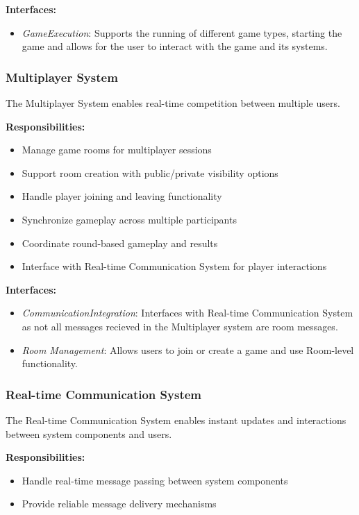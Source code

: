 \textbf{Interfaces:}
\begin{itemize}
    \item \textit{GameExecution}: Supports the running of different game types, starting the game and allows for the user to interact with the game and its systems.

\end{itemize}


\subsubsection{Multiplayer System}
The Multiplayer System enables real-time competition between multiple users.

\textbf{Responsibilities:}
\begin{itemize}
    \item Manage game rooms for multiplayer sessions
    \item Support room creation with public/private visibility options
    \item Handle player joining and leaving functionality
    \item Synchronize gameplay across multiple participants
    \item Coordinate round-based gameplay and results
    \item Interface with Real-time Communication System for player interactions
\end{itemize}

\textbf{Interfaces:}
\begin{itemize}
    \item \textit{CommunicationIntegration}: Interfaces with Real-time Communication System as not all messages recieved in the Multiplayer system are room messages.
    \item \textit{Room Management}: Allows users to join or create a game and use Room-level functionality.
\end{itemize}

\subsubsection{Real-time Communication System}
The Real-time Communication System enables instant updates and interactions between system components and users.

\textbf{Responsibilities:}
\begin{itemize}
    \item Handle real-time message passing between system components
    \item Provide reliable message delivery mechanisms
\end{itemize}

